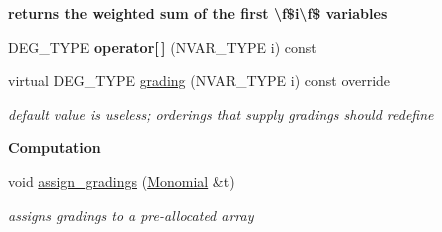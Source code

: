 \begin{Indent}\textbf{ returns the weighted sum of the first \textbackslash{}f\$i\textbackslash{}f\$ variables}\par
\begin{DoxyCompactItemize}
\item 
\mbox{\label{group__orderinggroup_a91af5dd81fbb141ab08be35acbd001a1}} 
D\+E\+G\+\_\+\+T\+Y\+PE {\bfseries operator\mbox{[}$\,$\mbox{]}} (N\+V\+A\+R\+\_\+\+T\+Y\+PE i) const
\item 
\mbox{\label{group__orderinggroup_a8490fdd2ae55fa7a25f896003da8128a}} 
virtual D\+E\+G\+\_\+\+T\+Y\+PE \hyperlink{group__orderinggroup_a8490fdd2ae55fa7a25f896003da8128a}{grading} (N\+V\+A\+R\+\_\+\+T\+Y\+PE i) const override
\begin{DoxyCompactList}\small\item\em default value is useless; orderings that supply gradings should redefine \end{DoxyCompactList}\end{DoxyCompactItemize}
\end{Indent}
\begin{Indent}\textbf{ Computation}\par
\begin{DoxyCompactItemize}
\item 
void \hyperlink{group__orderinggroup_a48f5464aaed30ba07d3eace69b2d87c1}{assign\+\_\+gradings} (\hyperlink{group__polygroup_class_monomial}{Monomial} \&t)
\begin{DoxyCompactList}\small\item\em assigns gradings to a pre-\/allocated array \end{DoxyCompactList}\end{DoxyCompactItemize}
\end{Indent}
